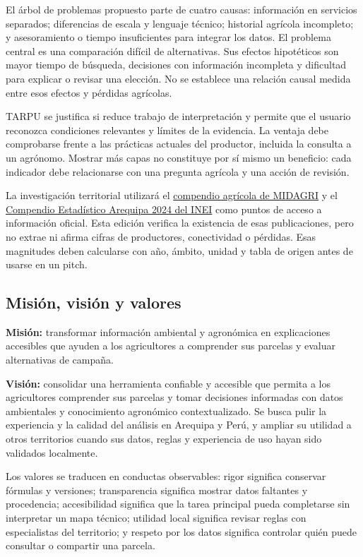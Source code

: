 \documentclass[10pt,a4paper]{article}
\begin{document}
El árbol de problemas propuesto parte de cuatro causas: información en servicios separados; diferencias de escala y lenguaje técnico; historial agrícola incompleto; y asesoramiento o tiempo insuficientes para integrar los datos. El problema central es una comparación difícil de alternativas. Sus efectos hipotéticos son mayor tiempo de búsqueda, decisiones con información incompleta y dificultad para explicar o revisar una elección. No se establece una relación causal medida entre esos efectos y pérdidas agrícolas.


TARPU se justifica si reduce trabajo de interpretación y permite que el usuario reconozca condiciones relevantes y límites de la evidencia. La ventaja debe comprobarse frente a las prácticas actuales del productor, incluida la consulta a un agrónomo. Mostrar más capas no constituye por sí mismo un beneficio: cada indicador debe relacionarse con una pregunta agrícola y una acción de revisión.


La investigación territorial utilizará el \href{https://www.gob.pe/institucion/midagri/colecciones/5149-anuarios-estadisticas-de-produccion-agropecuaria}{compendio agrícola de MIDAGRI} y el \href{https://www.gob.pe/institucion/inei/informes-publicaciones/6453267-compendio-estadistico-arequipa-2024}{Compendio Estadístico Arequipa 2024 del INEI} como puntos de acceso a información oficial. Esta edición verifica la existencia de esas publicaciones, pero no extrae ni afirma cifras de productores, conectividad o pérdidas. Esas magnitudes deben calcularse con año, ámbito, unidad y tabla de origen antes de usarse en un pitch.


\subsection{Misión, visión y valores}

\textbf{Misión:} transformar información ambiental y agronómica en explicaciones accesibles que ayuden a los agricultores a comprender sus parcelas y evaluar alternativas de campaña.


\textbf{Visión:} consolidar una herramienta confiable y accesible que permita a los agricultores comprender sus parcelas y tomar decisiones informadas con datos ambientales y conocimiento agronómico contextualizado. Se busca pulir la experiencia y la calidad del análisis en Arequipa y Perú, y ampliar su utilidad a otros territorios cuando sus datos, reglas y experiencia de uso hayan sido validados localmente.


Los valores se traducen en conductas observables: rigor significa conservar fórmulas y versiones; transparencia significa mostrar datos faltantes y procedencia; accesibilidad significa que la tarea principal pueda completarse sin interpretar un mapa técnico; utilidad local significa revisar reglas con especialistas del territorio; y respeto por los datos significa controlar quién puede consultar o compartir una parcela.
\end{document}
